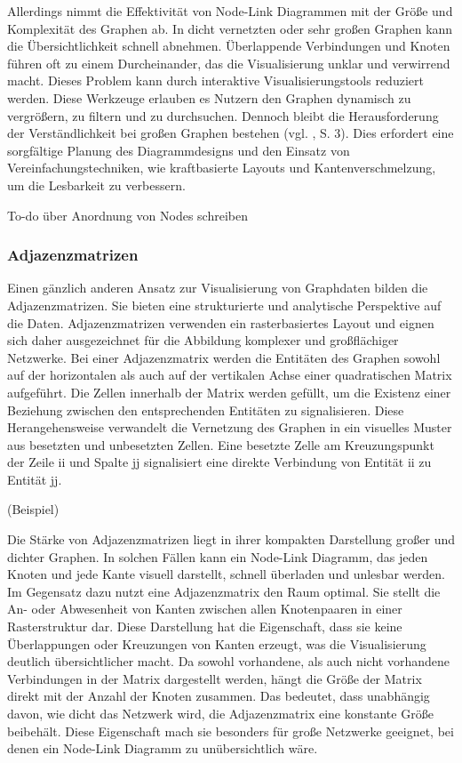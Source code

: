 Allerdings nimmt die Effektivität von Node-Link Diagrammen mit der Größe und Komplexität des Graphen ab. In dicht vernetzten oder sehr großen Graphen kann die Übersichtlichkeit schnell abnehmen. Überlappende Verbindungen und Knoten führen oft zu einem Durcheinander, das die Visualisierung unklar und verwirrend macht. Dieses Problem kann durch interaktive Visualisierungstools reduziert werden. Diese Werkzeuge erlauben es Nutzern den Graphen dynamisch zu vergrößern, zu filtern und zu durchsuchen. Dennoch bleibt die Herausforderung der Verständlichkeit bei großen Graphen bestehen (vgl. \cite{nodelink:DynamicGraph}, S. 3). Dies erfordert eine sorgfältige Planung des Diagrammdesigns und den Einsatz von Vereinfachungstechniken, wie kraftbasierte Layouts und Kantenverschmelzung, um die Lesbarkeit zu verbessern.

To-do über Anordnung von Nodes schreiben

\subsubsection{Adjazenzmatrizen}

Einen gänzlich anderen Ansatz zur Visualisierung von Graphdaten bilden die Adjazenzmatrizen. Sie bieten eine strukturierte und analytische Perspektive auf die Daten. Adjazenzmatrizen verwenden ein rasterbasiertes Layout und eignen sich daher ausgezeichnet für die Abbildung komplexer und großflächiger Netzwerke. Bei einer Adjazenzmatrix werden die Entitäten des Graphen sowohl auf der horizontalen als auch auf der vertikalen Achse einer quadratischen Matrix aufgeführt. Die Zellen innerhalb der Matrix werden gefüllt, um die Existenz einer Beziehung zwischen den entsprechenden Entitäten zu signalisieren. Diese Herangehensweise verwandelt die Vernetzung des Graphen in ein visuelles Muster aus besetzten und unbesetzten Zellen. Eine besetzte Zelle am Kreuzungspunkt der Zeile ii und Spalte jj signalisiert eine direkte Verbindung von Entität ii zu Entität jj.

(Beispiel)

Die Stärke von Adjazenzmatrizen liegt in ihrer kompakten Darstellung großer und dichter Graphen. In solchen Fällen kann ein Node-Link Diagramm, das jeden Knoten und jede Kante visuell darstellt, schnell überladen und unlesbar werden. Im Gegensatz dazu nutzt eine Adjazenzmatrix den Raum optimal. Sie stellt die An- oder Abwesenheit von Kanten zwischen allen Knotenpaaren in einer Rasterstruktur dar. Diese Darstellung hat die Eigenschaft, dass sie keine Überlappungen oder Kreuzungen von Kanten erzeugt, was die Visualisierung deutlich übersichtlicher macht. Da sowohl vorhandene, als auch nicht vorhandene Verbindungen in der Matrix dargestellt werden, hängt die Größe der Matrix direkt mit der Anzahl der Knoten zusammen. Das bedeutet, dass unabhängig davon, wie dicht das Netzwerk wird, die Adjazenzmatrix eine konstante Größe beibehält. Diese Eigenschaft mach sie besonders für große Netzwerke geeignet, bei denen ein Node-Link Diagramm zu unübersichtlich wäre. 


